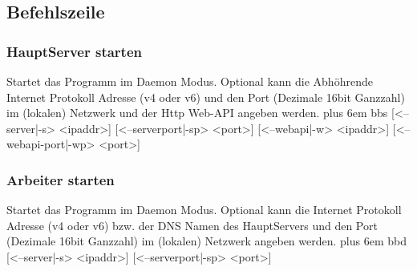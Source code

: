 \documentclass[a4paper,12pt]{article}
\makeatletter
\newenvironment{mycode}
 {\def\@xobeysp{\ }\verbatim\rightskip=0pt plus 6em\relax}
 {\endverbatim}
\makeatother
\begin{document}
\begin{center}
\end{center}

\clearpage


\clearpage

\subsection{Befehlszeile}

\subsubsection{Haupt\gls{Server} starten}
Startet das Programm im \gls{Daemon} Modus. Optional kann die Abhöhrende Internet Protokoll Adresse (v4 oder v6) und den Port (Dezimale 16bit Ganzzahl) im (lokalen) Netzwerk und der Http \gls{Web-API} angeben werden.
\begin{mycode}
bbs [<--server|-s> <ipaddr>] [<--serverport|-sp> <port>] [<--webapi}|-w> <ipaddr>] [<--webapi-port|-wp> <port>]
\end{mycode}

\subsubsection{Arbeiter starten}
Startet das Programm im \gls{Daemon} Modus. Optional kann die Internet Protokoll Adresse (v4 oder v6) bzw. der DNS Namen des Haupt\gls{Server}s und den Port (Dezimale 16bit Ganzzahl) im (lokalen) Netzwerk angeben werden.
\begin{mycode}
bbd [<--server|-s> <ipaddr>] [<--serverport|-sp> <port>]
\end{mycode}
\end{document}
